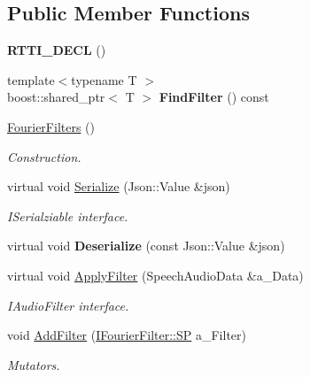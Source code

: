 \subsection*{Public Member Functions}
\begin{DoxyCompactItemize}
\item 
\mbox{\label{class_fourier_filters_a1194955fe9d06a2b1453165b5d1375b7}} 
{\bfseries R\+T\+T\+I\+\_\+\+D\+E\+CL} ()
\item 
\mbox{\label{class_fourier_filters_ab68f377ff94adb8e97c0425f3a7ab711}} 
{\footnotesize template$<$typename T $>$ }\\boost\+::shared\+\_\+ptr$<$ T $>$ {\bfseries Find\+Filter} () const
\item 
\mbox{\label{class_fourier_filters_a268c613597b9cf717e1564fe6fa636b9}} 
\hyperlink{class_fourier_filters_a268c613597b9cf717e1564fe6fa636b9}{Fourier\+Filters} ()
\begin{DoxyCompactList}\small\item\em Construction. \end{DoxyCompactList}\item 
\mbox{\label{class_fourier_filters_ae59b98c84e2cae9754bf743b706869d8}} 
virtual void \hyperlink{class_fourier_filters_ae59b98c84e2cae9754bf743b706869d8}{Serialize} (Json\+::\+Value \&json)
\begin{DoxyCompactList}\small\item\em I\+Serialziable interface. \end{DoxyCompactList}\item 
\mbox{\label{class_fourier_filters_a83afe09537b528b8bbc128ce744aaa58}} 
virtual void {\bfseries Deserialize} (const Json\+::\+Value \&json)
\item 
\mbox{\label{class_fourier_filters_ab3c9f0f031eed41cc32f9b2210b88021}} 
virtual void \hyperlink{class_fourier_filters_ab3c9f0f031eed41cc32f9b2210b88021}{Apply\+Filter} (Speech\+Audio\+Data \&a\+\_\+\+Data)
\begin{DoxyCompactList}\small\item\em I\+Audio\+Filter interface. \end{DoxyCompactList}\item 
\mbox{\label{class_fourier_filters_a355bfc3ec927b150379cae40896db624}} 
void \hyperlink{class_fourier_filters_a355bfc3ec927b150379cae40896db624}{Add\+Filter} (\hyperlink{class_fourier_filters_1_1_i_fourier_filter_acad39dd74318f8f8b06d80a00b19f8cb}{I\+Fourier\+Filter\+::\+SP} a\+\_\+\+Filter)
\begin{DoxyCompactList}\small\item\em Mutators. \end{DoxyCompactList}\end{DoxyCompactItemize}
